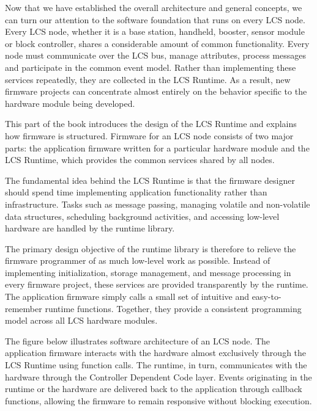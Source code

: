 %

Now that we have established the overall architecture and general concepts, we can turn our attention to the software foundation that runs on every LCS node. Every LCS node, whether it is a base station, handheld, booster, sensor module or block controller, shares a considerable amount of common functionality. Every node must communicate over the LCS bus, manage attributes, process messages and participate in the common event model. Rather than implementing these services repeatedly, they are collected in the LCS Runtime. As a result, new firmware projects can concentrate almost entirely on the behavior specific to the hardware module being developed.

This part of the book introduces the design of the LCS Runtime and explains how firmware is structured. Firmware for an LCS node consists of two major parts: the application firmware written for a particular hardware module and the LCS Runtime, which provides the common services shared by all nodes.


The fundamental idea behind the LCS Runtime is that the firmware designer should spend time implementing application functionality rather than infrastructure. Tasks such as message passing, managing volatile and non-volatile data structures, scheduling background activities, and accessing low-level hardware are handled by the runtime library.

The primary design objective of the runtime library is therefore to relieve the firmware programmer of as much low-level work as possible. Instead of implementing initialization, storage management, and message processing in every firmware project, these services are provided transparently by the runtime. The application firmware simply calls a small set of intuitive and easy-to-remember runtime functions. Together, they provide a consistent programming model across all LCS hardware modules.

The figure below illustrates software architecture of an LCS node. The application firmware interacts with the hardware almost exclusively through the LCS Runtime using function calls. The runtime, in turn, communicates with the hardware through the Controller Dependent Code layer. Events originating in the runtime or the hardware are delivered back to the application through callback functions, allowing the firmware to remain responsive without blocking execution.

